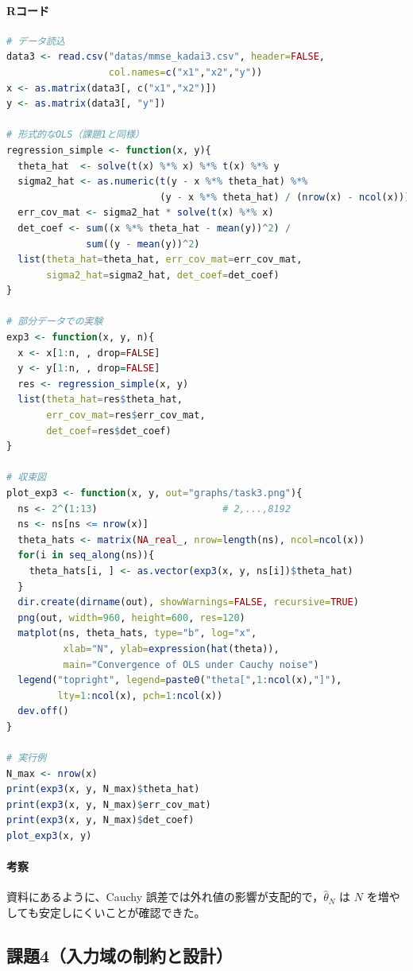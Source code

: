 \paragraph{Rコード}
\begin{lstlisting}[language=R]
# データ読込
data3 <- read.csv("datas/mmse_kadai3.csv", header=FALSE,
                  col.names=c("x1","x2","y"))
x <- as.matrix(data3[, c("x1","x2")])
y <- as.matrix(data3[, "y"])

# 形式的なOLS（課題1と同様）
regression_simple <- function(x, y){
  theta_hat  <- solve(t(x) %*% x) %*% t(x) %*% y
  sigma2_hat <- as.numeric(t(y - x %*% theta_hat) %*%
                           (y - x %*% theta_hat) / (nrow(x) - ncol(x)))
  err_cov_mat <- sigma2_hat * solve(t(x) %*% x)
  det_coef <- sum((x %*% theta_hat - mean(y))^2) /
              sum((y - mean(y))^2)
  list(theta_hat=theta_hat, err_cov_mat=err_cov_mat,
       sigma2_hat=sigma2_hat, det_coef=det_coef)
}

# 部分データでの実験
exp3 <- function(x, y, n){
  x <- x[1:n, , drop=FALSE]
  y <- y[1:n, , drop=FALSE]
  res <- regression_simple(x, y)
  list(theta_hat=res$theta_hat,
       err_cov_mat=res$err_cov_mat,
       det_coef=res$det_coef)
}

# 収束図
plot_exp3 <- function(x, y, out="graphs/task3.png"){
  ns <- 2^(1:13)                      # 2,...,8192
  ns <- ns[ns <= nrow(x)]
  theta_hats <- matrix(NA_real_, nrow=length(ns), ncol=ncol(x))
  for(i in seq_along(ns)){
    theta_hats[i, ] <- as.vector(exp3(x, y, ns[i])$theta_hat)
  }
  dir.create(dirname(out), showWarnings=FALSE, recursive=TRUE)
  png(out, width=960, height=600, res=120)
  matplot(ns, theta_hats, type="b", log="x",
          xlab="N", ylab=expression(hat(theta)),
          main="Convergence of OLS under Cauchy noise")
  legend("topright", legend=paste0("theta[",1:ncol(x),"]"),
         lty=1:ncol(x), pch=1:ncol(x))
  dev.off()
}

# 実行例
N_max <- nrow(x)
print(exp3(x, y, N_max)$theta_hat)
print(exp3(x, y, N_max)$err_cov_mat)
print(exp3(x, y, N_max)$det_coef)
plot_exp3(x, y)
\end{lstlisting}

\paragraph{考察}
資料にあるように、Cauchy 誤差では外れ値の影響が支配的で，$\hat\theta_N$ は $N$ を増やしても安定しにくいことが確認できた。


\subsection{課題4（入力域の制約と設計）}

